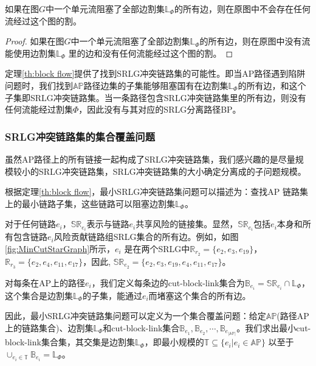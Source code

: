 \begin{theorem}
    如果在图$G$中一个单元流阻塞了全部边割集$\mathbb{L}_{\Phi}$的所有边，则在原图中不会存在任何流经过这个图的割。
\label{th:block flow}
\end{theorem}


\begin{proof}
    如果在图$G$中一个单元流阻塞了全部边割集$\mathbb{L}_{\Phi}$的所有边，则在原图中没有流能使用边割集$\mathbb{L}_{\Phi}$ 里的边和没有任何流能经过这个图的割。
\end{proof}
定理\ref{th:block flow}提供了找到SRLG冲突链路集的可能性。即当AP路径遇到陷阱问题时，我们找到$\mathbb{AP}$路径边集的子集能够阻塞国有在边割集$\mathbb{L}_{\Phi}$的所有边，和这个子集即SRLG冲突链路集。当一条路径包含SRLG冲突链路集里的所有边，则没有任何流能经过割集$\Phi$，因此没有与其对应的SRLG分离路径BP。

\subsubsection{SRLG冲突链路集的集合覆盖问题}
虽然AP路径上的所有链接一起构成了SRLG冲突链路集，我们感兴趣的是尽量规模较小的SRLG冲突链路集，SRLG冲突链路集的大小确定分离成的子问题规模。

根据定理\ref{th:block flow}，最小SRLG冲突链路集问题可以描述为：查找AP 链路集上的最小链路子集，这些链路可以阻塞边割集$\mathbb{L}_{\Phi}$。

对于任何链路$e_i$，$\mathbb{SR}_{e_i}$表示与链路$e_i$共享风险的链接集。显然，$\mathbb{SR}_{e_i}$包括$e_i$本身和所有包含链路$e_i$风险贡献链路组SRLG集合的所有边。例如，如图\ref{fig:MinCutStarGraph}所示，$e_i$ 是在两个SRLG中$\mathbb{R}_{r_2}=\{e_2,e_3,e_{19}\}$， $\mathbb{R}_{r_3}=\{e_2,e_4,e_{11},e_{17}\}$，因此, $\mathbb{SR}_{e_2}=\{e_2,e_3,e_{19},e_4,e_{11},e_{17}\}$。

对每条在AP上的路径$e_i$，我们定义每条边的cut-block-link集合为${\mathbb{B}_{{e_i}}} = \mathbb{SR}_{{e_i}} \cap \mathbb{L}_{\Phi}$，这个集合是边割集$\mathbb{L}_{\Phi}$的子集，能通过$e_i$而堵塞这个集合的所有边。

因此，最小SRLG冲突链路集问题可以定义为一个集合覆盖问题：给定$\mathbb{AP}$(路径AP上的链路集合)、边割集$\mathbb{L}_{\Phi}$和cut-block-link集合${\mathbb{B}_{{e_1}}},{\mathbb{B}_{{e_2}}}, \cdots ,{\mathbb{B}_{{e_{|\mathbb{AP}|}}}}$。我们求出最小cut-block-link集合集，其交集是边割集$\mathbb{L}_{\Phi}$，即最小规模的$\mathbb{T} \subseteq \{e_i| e_i\in \mathbb{AP}\}$ 以至于 ${ \cup_{e_i \in \mathbb{T}}}{\mathbb{B}_{e_i}} = \mathbb{L}_{\Phi}$。



